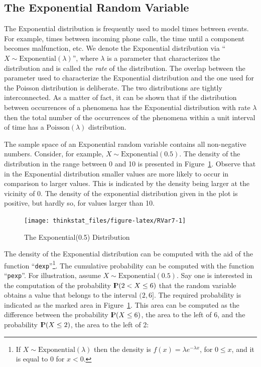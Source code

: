 \documentclass[]{krantz}
\newcommand{\Prob}{{\rm I\kern-.3em P}}
\theoremstyle{definition}
\theoremstyle{definition}
\theoremstyle{definition}
\theoremstyle{remark}
\begin{document}
\subsection{The Exponential Random
Variable}\label{the-exponential-random-variable}

The Exponential distribution is frequently used to model times between
events. For example, times between incoming phone calls, the time until
a component becomes malfunction, etc. We denote the Exponential
distribution via ``\(X \sim \mathrm{Exponential}(\lambda)\)'', where
\(\lambda\) is a parameter that characterizes the distribution and is
called the \emph{rate} of the distribution. The overlap between the
parameter used to characterize the Exponential distribution and the one
used for the Poisson distribution is deliberate. The two distributions
are tightly interconnected. As a matter of fact, it can be shown that if
the distribution between occurrences of a phenomena has the Exponential
distribution with rate \(\lambda\) then the total number of the
occurrences of the phenomena within a unit interval of time has a
\(\mathrm{Poisson}(\lambda)\) distribution.

The sample space of an Exponential random variable contains all
non-negative numbers. Consider, for example,
\(X \sim \mathrm{Exponential}(0.5)\). The density of the distribution in
the range between 0 and 10 is presented in Figure~\ref{fig:RVar7}.
Observe that in the Exponential distribution smaller values are more
likely to occur in comparison to larger values. This is indicated by the
density being larger at the vicinity of 0. The density of the
exponential distribution given in the plot is positive, but hardly so,
for values larger than 10.

\begin{figure}

{\centering \texttt{[image: thinkstat\_files/figure-latex/RVar7-1]} 

}

\caption{The Exponential(0.5) Distribution}\label{fig:RVar7}
\end{figure}

The density of the Exponential distribution can be computed with the aid
of the function ``\texttt{dexp}''\footnote{If
  \(X \sim \mathrm{Exponential}(\lambda)\) then the density is
  \(f(x) =\lambda e^{-\lambda x}\), for \(0 \leq x\), and it is equal to
  0 for \(x < 0\).}. The cumulative probability can be computed with the
function ``\texttt{pexp}''. For illustration, assume
\(X \sim \mathrm{Exponential}(0.5)\). Say one is interested in the
computation of the probability \(\Prob(2 < X \leq 6)\) that the random
variable obtains a value that belongs to the interval \((2,6]\). The
required probability is indicated as the marked area in
Figure~\ref{fig:RVar7}. This area can be computed as the difference
between the probability \(\Prob(X \leq 6)\), the area to the left of 6,
and the probability \(\Prob(X \leq 2)\), the area to the left of 2:
\end{document}
